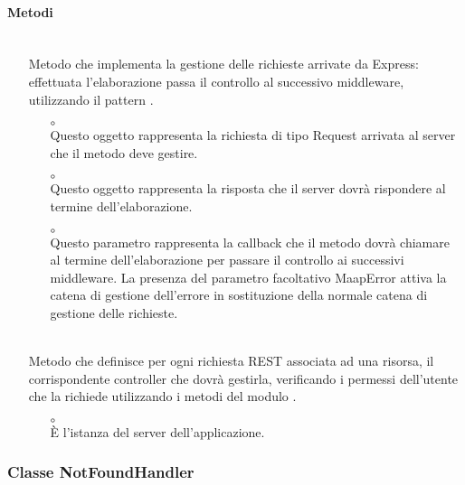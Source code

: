 \paragraph*{Metodi}
\begin{itemize}
\item[]  \\ Metodo che implementa la gestione delle richieste arrivate da Express: effettuata l'elaborazione passa il controllo al successivo middleware, utilizzando il pattern .
\begin{itemize}\addtolength{\itemsep}{-0.5\baselineskip}
\item[$\circ$]  \\ Questo oggetto rappresenta la richiesta di tipo Request arrivata al server che il metodo deve gestire.
\item[$\circ$]  \\ Questo oggetto rappresenta la risposta che il server dovrà rispondere al termine dell'elaborazione.
\item[$\circ$]  \\ Questo parametro rappresenta la callback che il metodo dovrà chiamare al termine dell'elaborazione per passare il controllo ai successivi middleware.
La presenza del parametro facoltativo MaapError attiva la catena di gestione dell'errore in sostituzione della normale catena di gestione delle richieste.
\end{itemize}
\item[]  \\ Metodo che definisce per ogni richiesta REST associata ad una risorsa, il corrispondente controller che dovrà gestirla, verificando i permessi dell'utente che la richiede utilizzando i metodi del modulo .

\begin{itemize}\addtolength{\itemsep}{-0.5\baselineskip}
\item[$\circ$]  \\ È l'istanza del server dell'applicazione.
\end{itemize}
\end{itemize}

\subsubsection{Classe NotFoundHandler}

